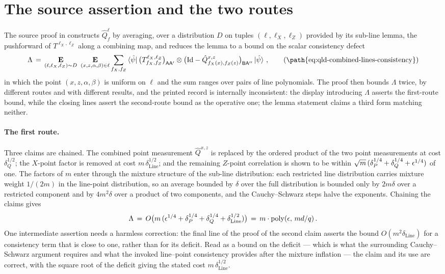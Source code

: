 \documentclass[11pt]{article}
\DeclareMathOperator{\poly}{poly}
\newcommand{\Id}{\mathrm{Id}}
\begin{document}
\section{The source assertion and the two routes}

The source proof in \cite{Ji2020MIPStar} constructs $\hat Q^{\ell}_f$ by
averaging, over a distribution $D$ on tuples $(\ell, \ell_X, \ell_Z)$
provided by its sub-line lemma, the pushforward of
$T^{\ell_X,\ell_Z}$ along a combining map, and reduces the lemma to a
bound on the scalar consistency defect
\begin{equation}
  \Lambda \,=\,
  \E_{(\ell,\ell_X,\ell_Z) \sim D}\
  \E_{(x,z,\alpha,\beta) \in \ell}
  \sum_{f_X,f_Z} \bra{\hat\psi}
  \big(T^{\ell_X,\ell_Z}_{f_X,f_Z}\big)_{\mathsf{A}\mathsf{A}'} \ot
  \big(\Id - \hat{Q}^{x,z}_{f_X(x),f_Z(z)}\big)_{\mathsf{B}\mathsf{A}''}
  \ket{\hat\psi}\,,
  \tag{\path{eq:qld-combined-lines-consistency}}
\end{equation}
in which the point $(x,z,\alpha,\beta)$ is uniform on $\ell$ and the sum
ranges over pairs of line polynomials.  The proof then bounds $\Lambda$
twice, by different routes and with different results, and the printed
record is internally inconsistent: the display introducing $\Lambda$
asserts the first-route bound, while the closing lines assert the
second-route bound as the operative one; the lemma statement claims a
third form matching neither.

\paragraph{The first route.}
Three claims are chained.  The combined point measurement
$\hat Q^{x,z}$ is replaced by the ordered product of the two point
measurements at cost $\delta_Q^{1/2}$; the $X$-point factor is removed at
cost $m\,\delta_{\mathrm{Line}}^{1/2}$; and the remaining $Z$-point
correlation is shown to be within
$\sqrt{m}\,(\delta_P^{1/4} + \delta_Q^{1/4} + \epsilon^{1/4})$ of one.  The
factors of $m$ enter through the mixture structure of the sub-line
distribution: each restricted line distribution carries mixture weight
$1/(2m)$ in the line-point distribution, so an average bounded by
$\delta$ over the full distribution is bounded only by $2m\delta$ over a
restricted component and by $4m^2\delta$ over a product of two
components, and the Cauchy--Schwarz steps halve the exponents.  Chaining
the claims gives
\begin{equation*}
  \Lambda \,=\, O\big(m\,(\eps^{1/4} + \delta_P^{1/4} + \delta_Q^{1/4}
  + \delta_{\mathrm{Line}}^{1/2})\big)
  \,=\, m \cdot \poly(\eps,\, md/q)\,.
\end{equation*}
One intermediate assertion needs a harmless correction: the final line
of the proof of the second claim asserts the bound
$O(m^2 \delta_{\mathrm{Line}})$ for a consistency term that is close to
one, rather than for its deficit.  Read as a bound on the deficit ---
which is what the surrounding Cauchy--Schwarz argument requires and what
the invoked line--point consistency provides after the mixture
inflation --- the claim and its use are correct, with the square root of
the deficit giving the stated cost $m\,\delta_{\mathrm{Line}}^{1/2}$.
\end{document}
